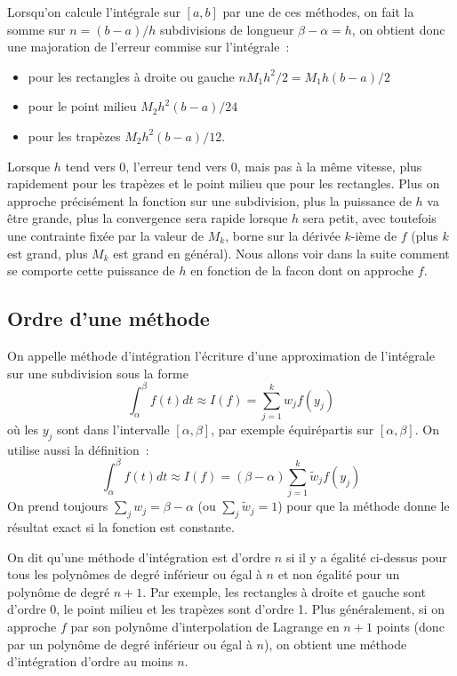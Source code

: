 \documentclass[a4paper,11pt]{article}
\begin{document}
Lorsqu'on calcule l'intégrale sur $[a,b]$ par une de ces méthodes,
on fait la somme sur $n=(b-a)/h$ subdivisions de longueur 
$\beta-\alpha=h$, on obtient
donc une majoration de l'erreur commise sur l'intégrale~:
\begin{itemize}
\item pour les rectangles à droite ou gauche $nM_1h^2/2=M_1 h (b-a)/2$
\item pour le point milieu $M_2 h^2 (b-a)/24$
\item pour les trapèzes $M_2h^2 (b-a)/12$.
\end{itemize}
Lorsque $h$ tend vers 0, l'erreur tend vers 0, mais pas à la même vitesse,
plus rapidement pour les trapèzes et le point milieu
que pour les rectangles. Plus on
approche précisément la fonction sur une subdivision, plus la
puissance de $h$ va être grande, plus la convergence sera rapide
lorsque $h$ sera petit, avec toutefois une contrainte fixée par la
valeur de $M_k$, borne sur la dérivée $k$-ième de $f$ (plus
$k$ est grand, plus $M_k$ est grand en général). Nous allons voir dans la suite
comment se comporte cette puissance de $h$ en fonction de la facon
dont on approche $f$.

\subsection{Ordre d'une méthode} 
On appelle méthode d'intégration l'écriture d'une approximation
de l'intégrale sur une subdivision sous la forme
\[ \int_{\alpha}^{\beta} f(t) dt \approx I(f)=\sum_{j=1}^k w_j f(y_j) \]
où les $y_j$ sont dans l'intervalle $[\alpha,\beta]$, par exemple équirépartis
sur $[\alpha,\beta]$. On utilise aussi la d\'efinition~:
\[ \int_{\alpha}^{\beta} f(t) dt \approx I(f)=
(\beta-\alpha)\sum_{j=1}^k \tilde{w}_j f(y_j) \]
On prend toujours $\sum_j w_j=\beta-\alpha$ (ou $\sum_j \tilde{w}_j=1$) pour
que la m\'ethode donne le r\'esultat exact si la fonction est constante.

On dit qu'une méthode d'intégration est d'ordre $n$ si il y a égalité
ci-dessus pour tous les polynômes de degré inférieur ou \'egal à $n$
et non \'egalit\'e pour un polyn\^ome de degr\'e $n+1$.
Par exemple, les rectangles à droite et gauche sont d'ordre 0, 
le point milieu et les trap\`ezes sont d'ordre 1. Plus
g\'en\'eralement, si on approche $f$ par son polyn\^ome
d'interpolation de Lagrange en $n+1$ points (donc par un polyn\^ome
de degr\'e inf\'erieur ou \'egal \`a $n$), on obtient une m\'ethode
d'int\'egration d'ordre au moins $n$.
\end{document}
